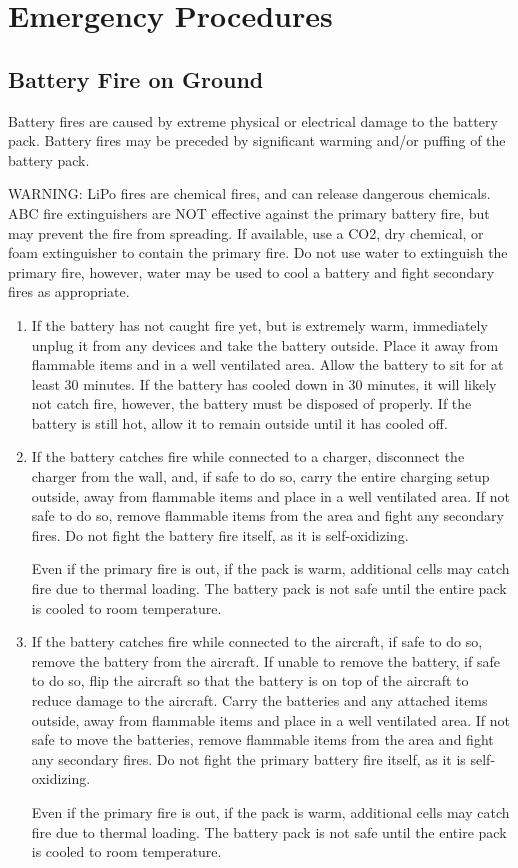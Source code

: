 \documentclass{report}
\begin{document}
\chapter{Emergency Procedures}
	\section{Battery Fire on Ground}
		Battery fires are caused by extreme physical or electrical damage to the battery pack.  Battery fires may be preceded by significant warming and/or puffing of the battery pack.
		\begin{mdframed}[linecolor=red,linewidth=4pt]
			WARNING: \gls{LiPo} fires are chemical fires, and can release dangerous chemicals.  ABC fire extinguishers are NOT effective against the primary battery fire, but may prevent the fire from spreading.  If available, use a CO2, dry chemical, or foam extinguisher to contain the primary fire.  Do not use water to extinguish the primary fire, however, water may be used to cool a battery and fight secondary fires as appropriate.
		\end{mdframed}
		\begin{enumerate}
			\item If the battery has not caught fire yet, but is extremely warm, immediately unplug it from any devices and take the battery outside.  Place it away from flammable items and in a well ventilated area. Allow the battery to sit for at least 30 minutes.  If the battery has cooled down in 30 minutes, it will likely not catch fire, however, the battery must be disposed of properly.  If the battery is still hot, allow it to remain outside until it has cooled off.
			\item If the battery catches fire while connected to a charger, disconnect the charger from the wall, and, if safe to do so, carry the entire charging setup outside, away from flammable items and place in a well ventilated area. If not safe to do so, remove flammable items from the area and fight any secondary fires.  Do not fight the battery fire itself, as it is self-oxidizing.

			Even if the primary fire is out, if the pack is warm, additional cells may catch fire due to thermal loading.  The battery pack is not safe until the entire pack is cooled to room temperature.
			\item If the battery catches fire while connected to the aircraft, if safe to do so, remove the battery from the aircraft.  If unable to remove the battery, if safe to do so, flip the aircraft so that the battery is on top of the aircraft to reduce damage to the aircraft.  Carry the batteries and any attached items outside, away from flammable items and place in a well ventilated area.  If not safe to move the batteries, remove flammable items from the area and fight any secondary fires.  Do not fight the primary battery fire itself, as it is self-oxidizing.

			Even if the primary fire is out, if the pack is warm, additional cells may catch fire due to thermal loading.  The battery pack is not safe until the entire pack is cooled to room temperature.
		\end{enumerate}
\end{document}
